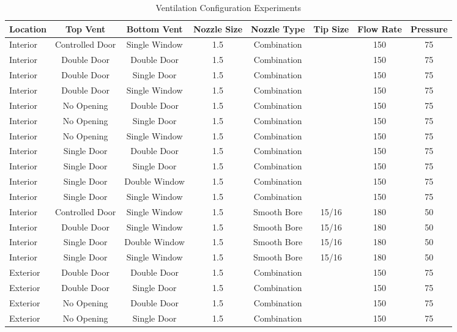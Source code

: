 \documentclass[12pt,oneside]{book}
\begin{document}
\begin{table}[!ht]
\centering
\footnotesize
\caption{Ventilation Configuration Experiments}
\label{Ventilation_Configuration_Experiments}
\begin{tabular}{lccccccc}
\toprule[1.5pt]
Location & Top Vent & Bottom Vent & Nozzle Size & Nozzle Type & Tip Size & Flow Rate & Pressure \\ 
\midrule
Interior & Controlled Door & Single Window & 1.5 & Combination &  & 150 & 75 \\
Interior & Double Door & Double Door & 1.5 & Combination &  & 150 & 75 \\
Interior & Double Door & Single Door & 1.5 & Combination &  & 150 & 75 \\
Interior & Double Door & Single Window & 1.5 & Combination &  & 150 & 75 \\
Interior & No Opening & Double Door & 1.5 & Combination &  & 150 & 75 \\
Interior & No Opening & Single Door & 1.5 & Combination &  & 150 & 75 \\
Interior & No Opening & Single Window & 1.5 & Combination &  & 150 & 75 \\
Interior & Single Door & Double Door & 1.5 & Combination &  & 150 & 75 \\
Interior & Single Door & Single Door & 1.5 & Combination &  & 150 & 75 \\
Interior & Single Door & Double Window & 1.5 & Combination &  & 150 & 75 \\
Interior & Single Door & Single Window & 1.5 & Combination &  & 150 & 75 \\
Interior & Controlled Door & Single Window & 1.5 & Smooth Bore & 15/16 & 180 & 50 \\
Interior & Double Door & Single Window & 1.5 & Smooth Bore & 15/16 & 180 & 50 \\
Interior & Single Door & Double Window & 1.5 & Smooth Bore & 15/16 & 180 & 50 \\
Interior & Single Door & Single Window & 1.5 & Smooth Bore & 15/16 & 180 & 50 \\
Exterior & Double Door & Double Door & 1.5 & Combination &  & 150 & 75 \\
Exterior & Double Door & Single Door & 1.5 & Combination &  & 150 & 75 \\
Exterior & No Opening & Double Door & 1.5 & Combination &  & 150 & 75 \\
Exterior & No Opening & Single Door & 1.5 & Combination &  & 150 & 75 \\

\end{tabular}
\end{table}
\end{document}
